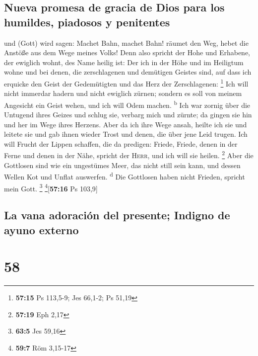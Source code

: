 \hypertarget{nueva-promesa-de-gracia-de-dios-para-los-humildes-piadosos-y-penitentes}{%
\subsection{Nueva promesa de gracia de Dios para los humildes, piadosos
y
penitentes}\label{nueva-promesa-de-gracia-de-dios-para-los-humildes-piadosos-y-penitentes}}

 und (Gott) wird sagen: Machet Bahn, machet Bahn! räumet
den Weg, hebet die Anstöße aus dem Wege meines Volks! 
Denn also spricht der Hohe und Erhabene, der ewiglich wohnt, des Name
heilig ist: Der ich in der Höhe und im Heiligtum wohne und bei denen,
die zerschlagenen und demütigen Geistes sind, auf dass ich erquicke den
Geist der Gedemütigten und das Herz der Zerschlagenen: \footnote{\textbf{57:15}
  Ps 113,5-9; Jes 66,1-2; Ps 51,19}  Ich will nicht
immerdar hadern und nicht ewiglich zürnen; sondern es soll von meinem
Angesicht ein Geist wehen, und ich will Odem machen. \textsuperscript{b}
 Ich war zornig über die Untugend ihres Geizes und schlug
sie, verbarg mich und zürnte; da gingen sie hin und her im Wege ihres
Herzens.  Aber da ich ihre Wege ansah, heilte ich sie und
leitete sie und gab ihnen wieder Trost und denen, die über jene Leid
trugen.  Ich will Frucht der Lippen schaffen, die da
predigen: Friede, Friede, denen in der Ferne und denen in der Nähe,
spricht der \textsc{Herr}, und ich will sie heilen. \footnote{\textbf{57:19}
  Eph 2,17}  Aber die Gottlosen sind wie ein ungestümes
Meer, das nicht still sein kann, und dessen Wellen Kot und Unflat
auswerfen. \textsuperscript{d}  Die Gottlosen haben nicht
Frieden, spricht mein Gott. \footnote{\textbf{63:5} Jes 59,16}
\footnote{\textbf{59:7} Röm 3,15-17}{[}\textbf{57:16} Ps 103,9{]}

\hypertarget{la-vana-adoraciuxf3n-del-presente-indigno-de-ayuno-externo}{%
\subsection{La vana adoración del presente; Indigno de ayuno
externo}\label{la-vana-adoraciuxf3n-del-presente-indigno-de-ayuno-externo}}

\hypertarget{section-57}{%
\section{58}\label{section-57}}

